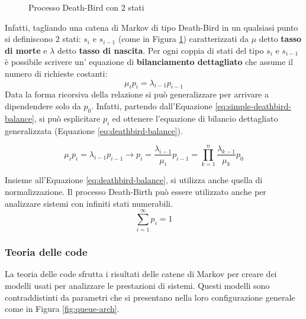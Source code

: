\documentclass{article}
\begin{document}
\begin{figure}
  \centering
  \caption{Processo Death-Bird con $2$ stati}
  \label{fig:ctcm-death-bird}
\end{figure}

Infatti, tagliando una catena di Markov di tipo Death-Bird in un qualsiasi punto si 
definiscono $2$ stati: $s_i$ e $s_{i-1}$ (come in Figura \ref{fig:ctcm-death-bird}) 
caratterizzati da $\mu$ detto \textbf{tasso di morte} e $\lambda$ detto \textbf{tasso di 
nascita}. Per ogni coppia di stati del tipo $s_i$ e $s_{i-1}$ è possibile scrivere un'
equazione di \textbf{bilanciamento dettagliato} che assume il numero di richieste costanti:
\begin{equation}
  \mu_i p_i = \lambda_{i-1} p_{i-1}
  \label{eq:simple-deathbird-balance}
\end{equation}
Data la forma ricorsiva della relazione si può generalizzare per arrivare a dipendendere 
solo da $p_0$. Infatti, partendo dall'Equazione \ref{eq:simple-deathbird-balance}, si 
può esplicitare $p_{i}$ ed ottenere l'equazione di bilancio dettagliato generalizzata 
(Equazione \ref{eq:deathbird-balance}).

\begin{equation}
  \mu_i p_i = \lambda_{i-1} p_{i-1} \to p_i = \frac{\lambda_{i-1}}{\mu_i}p_{i-1} =
  \prod_{k=1}^n\frac{\lambda_{k-1}}{\mu_k}p_0
  \label{eq:deathbird-balance}
\end{equation}

Insieme all'Equazione \ref{eq:deathbird-balance}, si utilizza anche quella di
normalizzazione. Il processo Death-Birth può essere utilizzato anche per analizzare sistemi
con infiniti stati numerabili.
\[
  \sum_{i=1}^\infty p_i = 1
\]

\subsubsection{Teoria delle code}
La teoria delle code sfrutta i risultati delle catene di Markov per creare dei modelli usati
per analizzare le prestazioni di sistemi. Questi modelli sono contraddistinti da parametri
che si presentano nella loro configurazione generale come in Figura \ref{fig:queue-arch}.
\end{document}
